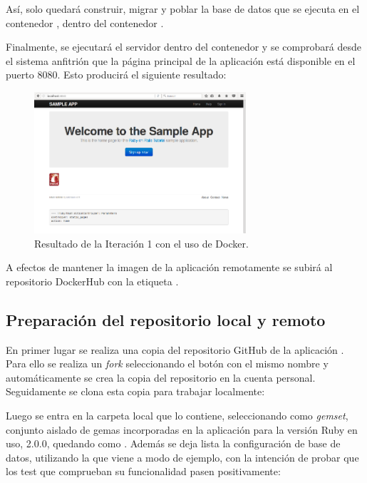 Así, solo quedará construir, migrar y poblar la base de datos que se ejecuta en el contenedor , dentro del contenedor .

Finalmente, se ejecutará el servidor  dentro del contenedor  y se comprobará desde el sistema anfitrión que la página principal de la aplicación  está disponible en el puerto 8080. Esto producirá el siguiente resultado:

\begin{figure}[H]
\centering
\includegraphics[width=0.7\textwidth]{images/figures/resultado1.png}
\caption{Resultado de la Iteración 1 con el uso de Docker.\label{fig:figure_placement_example}}
\end{figure}

A efectos de mantener la imagen de la aplicación remotamente se subirá al repositorio DockerHub con la etiqueta .

\subsection{Preparación del repositorio local y remoto}

En primer lugar se realiza una copia del repositorio GitHub de la aplicación . Para ello se realiza un \textit{fork} seleccionando el botón con el mismo nombre y automáticamente se crea la copia del repositorio en la cuenta personal. Seguidamente se clona esta copia para trabajar localmente:


Luego se entra en la carpeta local que lo contiene, seleccionando como \textit{gemset}, conjunto aislado de gemas incorporadas en la aplicación para la versión Ruby en uso, 2.0.0, quedando como . Además se deja lista la configuración de base de datos, utilizando la que viene a modo de ejemplo, con la intención de probar que los test que comprueban su funcionalidad pasen positivamente: 

